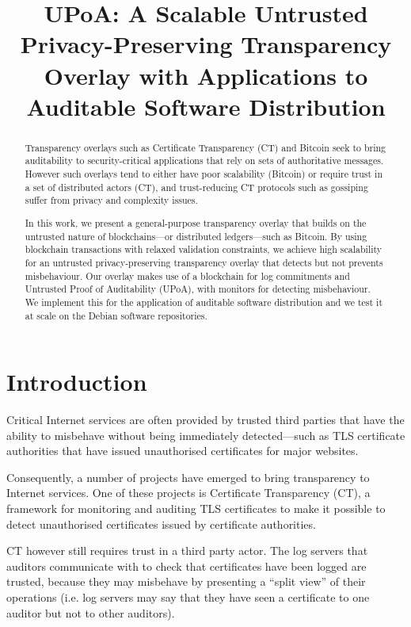 \documentclass{article}
\begin{document}
    \title{UPoA: A Scalable Untrusted Privacy-Preserving Transparency Overlay with Applications to Auditable Software Distribution}

    \maketitle
    \begin{abstract}
        Transparency overlays such as Certificate Transparency (CT) and Bitcoin seek to bring auditability to security-critical applications that rely on sets of authoritative messages. However such overlays tend to either have poor scalability (Bitcoin) or require trust in a set of distributed actors (CT), and trust-reducing CT protocols such as gossiping suffer from privacy and complexity issues.

        In this work, we present a general-purpose transparency overlay that builds on the untrusted nature of blockchains---or distributed ledgers---such as Bitcoin. By using blockchain transactions with relaxed validation constraints, we achieve high scalability for an untrusted privacy-preserving transparency overlay that detects but not prevents misbehaviour. Our overlay makes use of a blockchain for log commitments and Untrusted Proof of Auditability (UPoA), with monitors for detecting misbehaviour. We implement this for the application of auditable software distribution and we test it at scale on the Debian software repositories.
    \end{abstract}

    \section{Introduction}
    Critical Internet services are often provided by trusted third parties that have the ability to misbehave without being immediately detected---such as TLS certificate authorities that have issued unauthorised certificates for major websites.\cite{dangoodin2015}\cite{johnleyden2011}

    Consequently, a number of projects have emerged to bring transparency to Internet services. One of these projects is Certificate Transparency (CT), a framework for monitoring and auditing TLS certificates to make it possible to detect unauthorised certificates issued by certificate authorities.\cite{benlaurie2013}

    CT however still requires trust in a third party actor. The log servers that auditors communicate with to check that certificates have been logged are trusted, because they may misbehave by presenting a ``split view'' of their operations (i.e. log servers may say that they have seen a certificate to one auditor but not to other auditors).\cite{linusnordberg2015}
\end{document}
